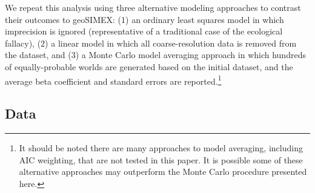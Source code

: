 We repeat this analysis using three alternative modeling approaches to contrast their outcomes to geoSIMEX: (1) an ordinary least squares model in which imprecision is ignored (representative of a traditional case of the ecological fallacy), (2) a linear model in which all coarse-resolution data is removed from the dataset, and (3) a Monte Carlo model averaging approach in which hundreds of equally-probable worlds are generated based on the initial dataset, and the average beta coefficient and standard errors are reported.\footnote{It should be noted there are many approaches to model averaging, including AIC weighting, that are not tested in this paper. It is possible some of these alternative approaches may outperform the Monte Carlo procedure presented here.}



\subsection{Data}


